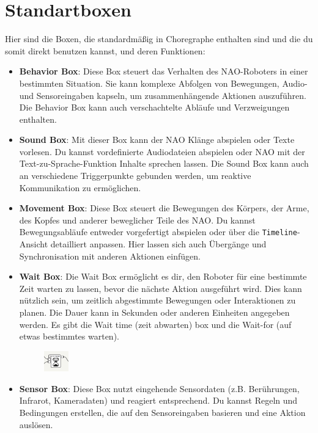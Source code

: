 \section{Standartboxen}
Hier sind die Boxen, die standardmäßig in Choregraphe enthalten sind und die du somit direkt benutzen kannst, und deren Funktionen:
\begin{itemize}
    \item \textbf{Behavior Box}: Diese Box steuert das Verhalten des NAO-Roboters in einer bestimmten Situation. Sie kann komplexe Abfolgen von Bewegungen, Audio- und Sensoreingaben kapseln, um zusammenhängende Aktionen auszuführen. Die Behavior Box kann auch verschachtelte Abläufe und Verzweigungen enthalten.
    \item \textbf{Sound Box}: Mit dieser Box kann der NAO Klänge abspielen oder Texte vorlesen. Du kannst vordefinierte Audiodateien abspielen oder NAO mit der Text-zu-Sprache-Funktion Inhalte sprechen lassen. Die Sound Box kann auch an verschiedene Triggerpunkte gebunden werden, um reaktive Kommunikation zu ermöglichen.
    \item \textbf{Movement Box}: Diese Box steuert die Bewegungen des Körpers, der Arme, des Kopfes und anderer beweglicher Teile des NAO. Du kannst Bewegungsabläufe entweder vorgefertigt abspielen oder über die \texttt{Timeline}-Ansicht detailliert anpassen. Hier lassen sich auch Übergänge und Synchronisation mit anderen Aktionen einfügen.
    \item \textbf{Wait Box}: Die Wait Box ermöglicht es dir, den Roboter für eine bestimmte Zeit warten zu lassen, bevor die nächste Aktion ausgeführt wird. Dies kann nützlich sein, um zeitlich abgestimmte Bewegungen oder Interaktionen zu planen. Die Dauer kann in Sekunden oder anderen Einheiten angegeben werden. Es gibt die Wait time (zeit abwarten) box und die Wait-for (auf etwas bestimmtes warten).
    \begin{figure}[h]
        \centering
        \includegraphics[width=0.1\textwidth]{../images/waitBox.png}
        \label{fig:waitBox}
    \end{figure}
    \item \textbf{Sensor Box}: Diese Box nutzt eingehende Sensordaten (z.B. Berührungen, Infrarot, Kameradaten) und reagiert entsprechend. Du kannst Regeln und Bedingungen erstellen, die auf den Sensoreingaben basieren und eine Aktion auslösen.

\end{itemize}
